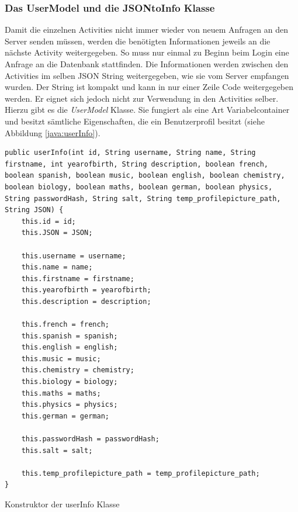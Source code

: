 \documentclass[a4paper,11pt]{report}
\newenvironment{code}{\captionsetup{type=figure}}{}
\begin{document}
				\subsubsection{Das UserModel und die JSONtoInfo Klasse} \label{userInfo}
				Damit die einzelnen Activities nicht immer wieder von neuem Anfragen an den Server senden müssen, werden die benötigten Informationen jeweils an die nächste Activity weitergegeben. So muss nur einmal zu Beginn beim Login eine Anfrage an die Datenbank stattfinden. Die Informationen werden zwischen den Activities im selben JSON String weitergegeben, wie sie vom Server empfangen wurden. Der String ist kompakt und kann in nur einer Zeile Code weitergegeben werden. Er eignet sich jedoch nicht zur Verwendung in den Activities selber. Hierzu gibt es die \emph{UserModel} Klasse. Sie fungiert als eine Art \glqq Variabelcontainer\grqq{} und besitzt sämtliche Eigenschaften, die ein Benutzerprofil besitzt (siehe Abbildung \ref{java:userInfo}).
\begin{code}
	\begin{center}
		\begin{verbatim}
public userInfo(int id, String username, String name, String firstname, int yearofbirth, String description, boolean french, boolean spanish, boolean music, boolean english, boolean chemistry, boolean biology, boolean maths, boolean german, boolean physics, String passwordHash, String salt, String temp_profilepicture_path, String JSON) {
	this.id = id;
	this.JSON = JSON;
	
	this.username = username;
	this.name = name;
	this.firstname = firstname;
	this.yearofbirth = yearofbirth;
	this.description = description;
	
	this.french = french;
	this.spanish = spanish;
	this.english = english;
	this.music = music;
	this.chemistry = chemistry;
	this.biology = biology;
	this.maths = maths;
	this.physics = physics;
	this.german = german;
	
	this.passwordHash = passwordHash;
	this.salt = salt;
	
	this.temp_profilepicture_path = temp_profilepicture_path;
}
		\end{verbatim}
	\caption{Konstruktor der userInfo Klasse}\label{java:userInfo}
	\end{center}
\end{code}
\end{document}
